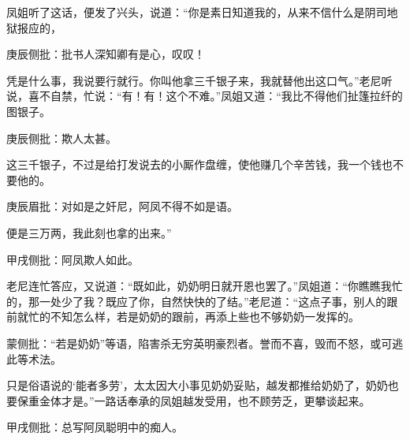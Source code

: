 \begin{parag}
    凤姐听了这话，便发了兴头，说道：“你是素日知道我的，从来不信什么是阴司地狱报应的，\begin{note}庚辰侧批：批书人深知卿有是心，叹叹！\end{note}凭是什么事，我说要行就行。你叫他拿三千银子来，我就替他出这口气。”老尼听说，喜不自禁，忙说：“有！有！这个不难。”凤姐又道：“我比不得他们扯篷拉纤的图银子。\begin{note}庚辰侧批：欺人太甚。\end{note}这三千银子，不过是给打发说去的小厮作盘缠，使他赚几个辛苦钱，我一个钱也不要他的。\begin{note}庚辰眉批：对如是之奸尼，阿凤不得不如是语。\end{note}便是三万两，我此刻也拿的出来。”\begin{note}甲戌侧批：阿凤欺人如此。\end{note}老尼连忙答应，又说道：“既如此，奶奶明日就开恩也罢了。”凤姐道：“你瞧瞧我忙的，那一处少了我？既应了你，自然快快的了结。”老尼道：“这点子事，别人的跟前就忙的不知怎么样，若是奶奶的跟前，再添上些也不够奶奶一发挥的。\begin{note}蒙侧批：“若是奶奶”等语，陷害杀无穷英明豪烈者。誉而不喜，毁而不怒，或可逃此等术法。\end{note}只是俗语说的‘能者多劳’，太太因大小事见奶奶妥贴，越发都推给奶奶了，奶奶也要保重金体才是。”一路话奉承的凤姐越发受用，也不顾劳乏，更攀谈起来。\begin{note}甲戌侧批：总写阿凤聪明中的痴人。\end{note}
\end{parag}


